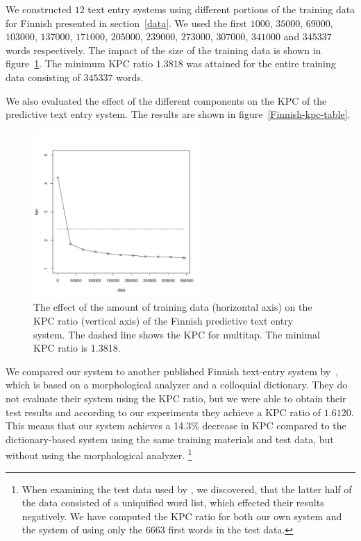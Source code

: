 \documentclass{llncs}
\begin{document}
We constructed $12$ text entry systems using different portions of the
training data for Finnish presented in section~\ref{data}. We used the
first $1000$, $35000$, $69000$, $103000$, $137000$, $171000$,
$205000$, $239000$, $273000$, $307000$, $341000$ and $345337$ words
respectively. The impact of the size of the training data is shown in
figure~\ref{fi-kpc-graph}. The minimum KPC ratio $1.3818$ was attained
for the entire training data consisting of $345337$ words.

We also evaluated the effect of the different components on the KPC of
the predictive text entry system. The results are shown in
figure~\ref{Finnish-kpc-table}.

\begin{figure}[hbt!]
\begin{center}
\includegraphics[width=2.5in]{finnish_kpc_figure.pdf}
\end{center}
\caption{The effect of the amount of training data (horizontal axis)
  on the KPC ratio (vertical axis) of the Finnish predictive text
  entry system. The dashed line shows the KPC for
  multitap. The minimal KPC ratio is 1.3818.}\label{fi-kpc-graph}
\end{figure}

We compared our system to another published Finnish text-entry system
by~\cite{silfverberg/2011/cla}, which is based on a morphological
analyzer and a colloquial dictionary. They do not evaluate their
system using the KPC ratio, but we were able to obtain their test
results and according to our experiments they achieve a KPC ratio of
$1.6120$. This means that our system achieves a 14.3\% decrease in KPC
compared to the dictionary-based system using the same training
materials and test data, but without using the morphological
analyzer. \footnote{When examining the test data used by
  \cite{silfverberg/2011/cla}, we discovered, that the latter half of
  the data consisted of a uniquified word list, which effected their
  results negatively. We have computed the KPC ratio for both our own
  system and the system of \cite{silfverberg/2011/cla} using only the
  $6663$ first words in the test data.}
\end{document}
